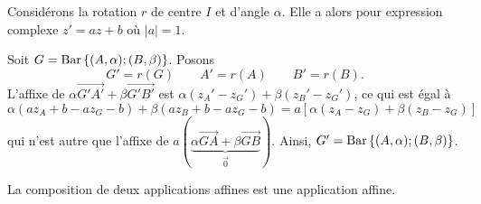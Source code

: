             \begin{ex}
                  Consid\'erons la rotation $r$ de centre $I$ et d'angle $\alpha$.
                  Elle a alors pour expression complexe $z' = az + b$ o\`u $|a| = 1$.
                  
                  Soit $G = \mathrm{Bar}\left\lbrace (A,\alpha);(B,\beta) \right\rbrace$. 
                  Posons
                        $$
                        G' = r(G)
                              \qquad
                        A' = r(A)
                              \qquad
                        B' = r(B).
                        $$
                  L'affixe de $\alpha \overrightarrow{G'A'} + \beta \overrightarrow{G'B'}$ 
                  est $\alpha (z_A' - z_G') + \beta (z_B' - z_G')$,
                  ce qui est \'egal \`a 
                  \[
                        \alpha (a z_A + b - a z_G - b) + \beta (a z_B + b - a z_G - b) =
                                                      a \left[ \alpha (z_A - z_G) + \beta (z_B - z_G) \right] \]
                  qui n'est autre que l'affixe de 
                  $a ( \underbrace{\alpha \overrightarrow{GA} + \beta \overrightarrow{GB}}_{\vec{0}} )$.
                  Ainsi, $G'= \mathrm{Bar}\left\lbrace (A,\alpha);(B,\beta) \right\rbrace$.
            \end{ex}
%
      \begin{thm}
            La composition de deux applications affines est une application affine.
            \newline {}
      \end{thm}
%
